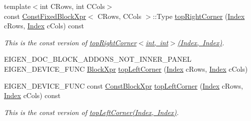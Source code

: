 \begin{DoxyCompactItemize}
\item 
\mbox{\label{class_eigen_1_1_sparse_matrix_base_ad48496ebbfcd6cb685f893246de1d934}} 
{\footnotesize template$<$int C\+Rows, int C\+Cols$>$ }\\const \mbox{\hyperlink{struct_eigen_1_1_sparse_matrix_base_1_1_const_fixed_block_xpr}{Const\+Fixed\+Block\+Xpr}}$<$ C\+Rows, C\+Cols $>$\+::Type \mbox{\hyperlink{class_eigen_1_1_sparse_matrix_base_ad48496ebbfcd6cb685f893246de1d934}{top\+Right\+Corner}} (\mbox{\hyperlink{struct_eigen_1_1_eigen_base_a554f30542cc2316add4b1ea0a492ff02}{Index}} c\+Rows, \mbox{\hyperlink{struct_eigen_1_1_eigen_base_a554f30542cc2316add4b1ea0a492ff02}{Index}} c\+Cols) const
\begin{DoxyCompactList}\small\item\em This is the const version of \mbox{\hyperlink{class_eigen_1_1_sparse_matrix_base_a709232ffb83f5c4c054de1c7655e8b99}{top\+Right\+Corner$<$int, int$>$(\+Index, Index)}}. \end{DoxyCompactList}\item 
E\+I\+G\+E\+N\+\_\+\+D\+O\+C\+\_\+\+B\+L\+O\+C\+K\+\_\+\+A\+D\+D\+O\+N\+S\+\_\+\+N\+O\+T\+\_\+\+I\+N\+N\+E\+R\+\_\+\+P\+A\+N\+EL E\+I\+G\+E\+N\+\_\+\+D\+E\+V\+I\+C\+E\+\_\+\+F\+U\+NC \mbox{\hyperlink{class_eigen_1_1_block}{Block\+Xpr}} \mbox{\hyperlink{class_eigen_1_1_sparse_matrix_base_a5e0cd43cb4555c7ef79fd0481d117cce}{top\+Left\+Corner}} (\mbox{\hyperlink{struct_eigen_1_1_eigen_base_a554f30542cc2316add4b1ea0a492ff02}{Index}} c\+Rows, \mbox{\hyperlink{struct_eigen_1_1_eigen_base_a554f30542cc2316add4b1ea0a492ff02}{Index}} c\+Cols)
\item 
\mbox{\label{class_eigen_1_1_sparse_matrix_base_ab1080faa159c59aa95b5dc2f7ba27250}} 
E\+I\+G\+E\+N\+\_\+\+D\+E\+V\+I\+C\+E\+\_\+\+F\+U\+NC const \mbox{\hyperlink{class_eigen_1_1_block}{Const\+Block\+Xpr}} \mbox{\hyperlink{class_eigen_1_1_sparse_matrix_base_ab1080faa159c59aa95b5dc2f7ba27250}{top\+Left\+Corner}} (\mbox{\hyperlink{struct_eigen_1_1_eigen_base_a554f30542cc2316add4b1ea0a492ff02}{Index}} c\+Rows, \mbox{\hyperlink{struct_eigen_1_1_eigen_base_a554f30542cc2316add4b1ea0a492ff02}{Index}} c\+Cols) const
\begin{DoxyCompactList}\small\item\em This is the const version of \mbox{\hyperlink{class_eigen_1_1_sparse_matrix_base_a5e0cd43cb4555c7ef79fd0481d117cce}{top\+Left\+Corner(\+Index, Index)}}. \end{DoxyCompactList}\item 

\end{DoxyCompactItemize}
